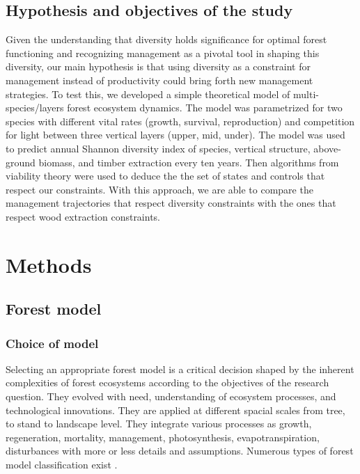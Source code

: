 \documentclass{article}
\begin{document}
\subsection{Hypothesis and objectives of the study}

Given the understanding that diversity holds significance for optimal forest functioning and recognizing management as a pivotal tool in shaping this diversity, our main hypothesis is that using diversity as a constraint for management instead of productivity could bring forth new management strategies. To test this, we developed a simple theoretical model of multi-species/layers forest ecosystem dynamics. The model was parametrized for two species with different vital rates (growth, survival, reproduction) and competition for light between three vertical layers (upper, mid, under). The model was used to predict annual Shannon diversity index of species, vertical structure, above-ground biomass, and timber extraction every ten years. Then algorithms from viability theory were used to deduce the the set of states and controls that respect our constraints. With this approach, we are able to compare the management trajectories that respect diversity constraints with the ones that respect wood extraction constraints. 

\section{Methods}

\subsection{Forest model}
 
\subsubsection{Choice of model}

Selecting an appropriate forest model is a critical decision shaped by the inherent complexities of forest ecosystems according to the objectives of the research question. They evolved with need, understanding of ecosystem processes, and technological innovations. They are applied at different spacial scales from tree, to stand to landscape level. They integrate various processes as growth, regeneration, mortality, management, photosynthesis, evapotranspiration, disturbances with more or less details and assumptions. Numerous types of forest model classification exist \autocite{porteModellingMixedForest2002}. 
\end{document}
